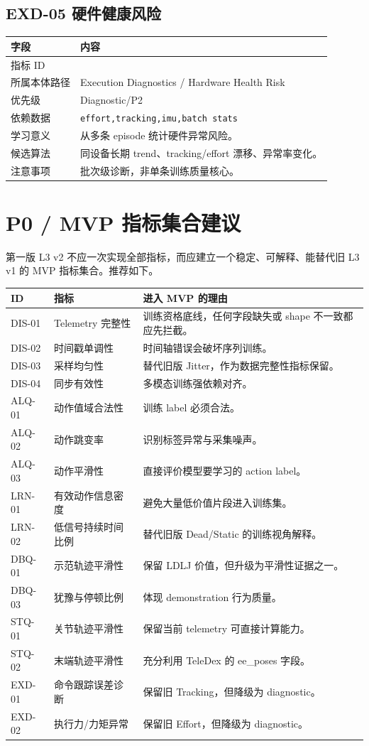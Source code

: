 \documentclass[UTF8,zihao=-4,oneside,openany]{ctexrep}
\newcommand{\Code}[1]{\texttt{#1}}
\newcommand{\MID}[1]{\texttt{\seqsplit{#1}}}
\begin{document}
\subsection{EXD-05 硬件健康风险}

\begin{longtable}{L{3.6cm} L{9.6cm}}
\toprule
字段 & 内容 \\
\midrule
指标 ID & \MID{EXD-05} \\
所属本体路径 & Execution Diagnostics / Hardware Health Risk \\
优先级 & Diagnostic/P2 \\
依赖数据 & \Code{effort,tracking,imu,batch stats} \\
学习意义 & 从多条 episode 统计硬件异常风险。 \\
候选算法 & 同设备长期 trend、tracking/effort 漂移、异常率变化。 \\
注意事项 & 批次级诊断，非单条训练质量核心。 \\
\bottomrule
\end{longtable}

\section{P0 / MVP 指标集合建议}

第一版 L3 v2 不应一次实现全部指标，而应建立一个稳定、可解释、能替代旧 L3 v1 的 MVP 指标集合。推荐如下。

\begin{longtable}{L{2.2cm} L{4.5cm} L{6.3cm}}
\toprule
ID & 指标 & 进入 MVP 的理由 \\
\midrule
DIS-01 & Telemetry 完整性 & 训练资格底线，任何字段缺失或 shape 不一致都应先拦截。 \\
DIS-02 & 时间戳单调性 & 时间轴错误会破坏序列训练。 \\
DIS-03 & 采样均匀性 & 替代旧版 Jitter，作为数据完整性指标保留。 \\
DIS-04 & 同步有效性 & 多模态训练强依赖对齐。 \\
ALQ-01 & 动作值域合法性 & 训练 label 必须合法。 \\
ALQ-02 & 动作跳变率 & 识别标签异常与采集噪声。 \\
ALQ-03 & 动作平滑性 & 直接评价模型要学习的 action label。 \\
LRN-01 & 有效动作信息密度 & 避免大量低价值片段进入训练集。 \\
LRN-02 & 低信号持续时间比例 & 替代旧版 Dead/Static 的训练视角解释。 \\
DBQ-01 & 示范轨迹平滑性 & 保留 LDLJ 价值，但升级为平滑性证据之一。 \\
DBQ-03 & 犹豫与停顿比例 & 体现 demonstration 行为质量。 \\
STQ-01 & 关节轨迹平滑性 & 保留当前 telemetry 可直接计算能力。 \\
STQ-02 & 末端轨迹平滑性 & 充分利用 TeleDex 的 ee\_poses 字段。 \\
EXD-01 & 命令跟踪误差诊断 & 保留旧 Tracking，但降级为 diagnostic。 \\
EXD-02 & 执行力/力矩异常 & 保留旧 Effort，但降级为 diagnostic。 \\
\bottomrule
\end{longtable}
\end{document}
